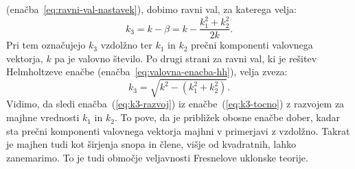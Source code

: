 (enačba~\ref{eq:ravni-val-nastavek}), dobimo ravni val, za katerega velja:
\begin{equation}
k_{3}=k-\beta=k-\frac{k_{1}^{2}+k_{2}^{2}}{2k}.
\label{eq:k3-razvoj}
\end{equation}
Pri tem označujejo $k_{3}$ vzdolžno ter $k_{1}$ in $k_{2}$ prečni komponenti valovnega 
vektorja, $k$ pa je valovno število. Po drugi strani za ravni val, ki je 
rešitev Helmholtzeve enačbe (enačba~\ref{eq:valovna-enacba-hh}), velja zveza:
\begin{equation}
k_{3}=\sqrt{k^{2}-(k_{1}^{2}+k_{2}^{2})}.\label{eq:k3-tocno}
\end{equation}
Vidimo, da sledi enačba~(\ref{eq:k3-razvoj}) iz enačbe~(\ref{eq:k3-tocno})
z razvojem za majhne vrednosti $k_1$ in $k_2$. To pove, da je približek obosne 
enačbe dober, kadar sta prečni komponenti valovnega vektorja 
majhni v primerjavi z vzdolžno. 
Takrat je majhen tudi kot širjenja snopa in člene, višje od kvadratnih,
lahko zanemarimo. To je tudi območje veljavnosti Fresnelove uklonske
teorije.

